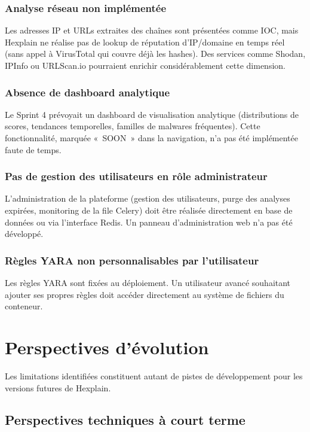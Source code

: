 \subsubsection{Analyse réseau non implémentée}
Les adresses IP et URLs extraites des chaînes sont présentées comme IOC, mais Hexplain ne réalise pas de lookup de réputation d'IP/domaine en temps réel (sans appel à VirusTotal qui couvre déjà les hashes). Des services comme Shodan, IPInfo ou URLScan.io pourraient enrichir considérablement cette dimension.

\subsubsection{Absence de dashboard analytique}
Le Sprint 4 prévoyait un dashboard de visualisation analytique (distributions de scores, tendances temporelles, familles de malwares fréquentes). Cette fonctionnalité, marquée «~SOON~» dans la navigation, n'a pas été implémentée faute de temps.

\subsubsection{Pas de gestion des utilisateurs en rôle administrateur}
L'administration de la plateforme (gestion des utilisateurs, purge des analyses expirées, monitoring de la file Celery) doit être réalisée directement en base de données ou via l'interface Redis. Un panneau d'administration web n'a pas été développé.

\subsubsection{Règles YARA non personnalisables par l'utilisateur}
Les règles YARA sont fixées au déploiement. Un utilisateur avancé souhaitant ajouter ses propres règles doit accéder directement au système de fichiers du conteneur.

\section{Perspectives d'évolution}

Les limitations identifiées constituent autant de pistes de développement pour les versions futures de Hexplain.

\subsection{Perspectives techniques à court terme}

